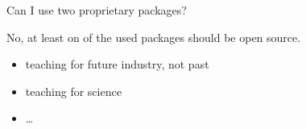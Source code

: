 \documentclass[xcolor={dvipsnames,usenames},beamer]{beamer}
\begin{document}
\begin{frame}{Can I use two proprietary packages?}

No, at least on of the used packages should be open source.

\begin{itemize}
 \item teaching for future industry, not past
 \item teaching for science
 \item \ldots
\end{itemize}


\end{frame}



\end{document}
